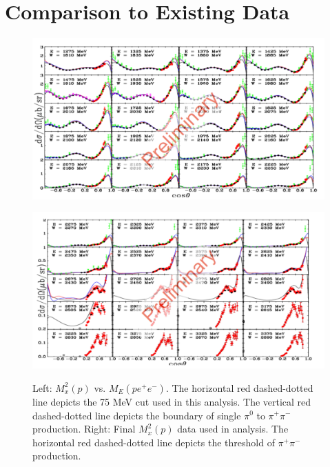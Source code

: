 \documentclass{aip-cp}
\begin{document}
\section{Comparison to Existing Data}
\begin{figure}[h!]
	\centering
	\begin{minipage}{.50\textwidth}
		\centering
		\includegraphics[width=225 pt, height = 160 pt]{figures/pi0_xsectionI.pdf}
		\caption{}{}
		\label{fig:pi0I}
	\end{minipage}%
	\centering
	\begin{minipage}{.50\textwidth}
		\centering
		\includegraphics[width=225 pt, height = 160 pt]{figures/pi0_xsectionII.pdf}
		\caption{Left: $M_x^2 (p)$ vs. $M_E(pe^+e^-)$. The horizontal red dashed-dotted line depicts the 75 MeV cut used in this analysis. The vertical red dashed-dotted line depicts the boundary of single $\pi^0$ to $\pi^{+}\pi^{-}$ production. Right: Final $M_x^2(p)$ data used in analysis. The horizontal red dashed-dotted line depicts the threshold of $\pi^{+}\pi^{-}$ production.}{}
		\label{fig:pi0II}
	\end{minipage}
\end{figure}
\end{document}
